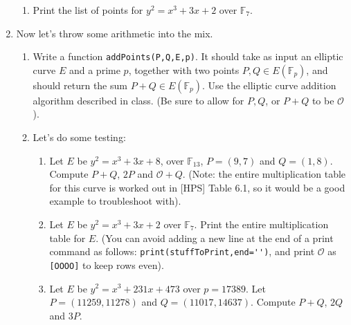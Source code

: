 \documentclass[11pt]{article}
\newcommand{\bF}{\mathbb{F}}
\newcommand{\cO}{\mathcal{O}}
\begin{document}
\begin{enumerate}
{\begin{enumerate}
{\begin{enumerate}
    \end{enumerate}
    }
    \item{
    Print the list of points for $y^2 = x^3 + 3x + 2$ over $\bF_7$.
    }
  \end{enumerate}
  }
  \item{
  Now let's throw some arithmetic into the mix.
  \begin{enumerate}
    \item{
    Write a function \verb|addPoints(P,Q,E,p)|.  It should take as input an elliptic curve $E$ and a prime $p$, together with two points $P,Q\in E(\bF_p)$, and should return the sum $P+Q\in E(\bF_p)$.  Use the elliptic curve addition algorithm described in class.  (Be sure to allow for $P,Q$, or $P+Q$ to be $\cO$).
    }
    \item{
    Let's do some testing:
    \begin{enumerate}
      \item{
      Let $E$ be $y^2 = x^3 + 3x + 8$, over $\bF_{13}$,  $P=(9,7)$ and $Q = (1,8)$.  Compute $P+Q$, $2P$ and $\cO+Q$.  (Note: the entire multiplication table for this curve is worked out in [HPS] Table 6.1, so it would be a good example to troubleshoot with).
      }
      \item{
      Let $E$ be $y^2 = x^3 + 3x + 2$ over $\bF_7$.  Print the entire multiplication table for $E$.  (You can avoid adding a new line at the end of a print command as follows: \verb|print(stuffToPrint,end='')|, and print $\cO$ as \verb|[OOOO]| to keep rows even).
      }
      \item{
      Let $E$ be $y^2 = x^3 + 231x + 473$ over $p=17389$.  Let $P = (11259,11278)$ and $Q = (11017,14637)$.  Compute $P+Q$, $2Q$ and $3P$.
      }
    \end{enumerate}
    }
  \end{enumerate}
  }
  \end{enumerate}
\end{document}
